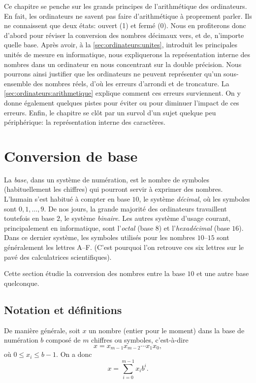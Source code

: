 \documentclass[letterpaper,11pt,english,french]{memoir}
\theoremstyle{plain}
\theoremstyle{definition}
\theoremstyle{remark}
\begin{document}
Ce chapitre se penche sur les grands principes de l'arithmétique des
ordinateurs. En fait, les ordinateurs ne savent pas faire
d'arithmétique à proprement parler. Ils ne connaissent que deux états:
ouvert (1) et fermé (0). Nous en profiterons donc d'abord pour réviser
la conversion des nombres décimaux vers, et de, n'importe quelle base.
Après avoir, à la \autoref{sec:ordinateurs:unites}, introduit les
principales unités de mesure en informatique, nous expliquerons la
représentation interne des nombres dans un ordinateur en nous
concentrant sur la double précision. Nous pourrons ainsi justifier que
les ordinateurs ne peuvent représenter qu'un sous-ensemble des nombres
réels, d'où les erreurs d'arrondi et de troncature. La
\autoref{sec:ordinateurs:arithmetique} explique comment ces erreurs
surviennent. On y donne également quelques pistes pour éviter ou pour
diminuer l'impact de ces erreurs. Enfin, le chapitre se clôt par un
survol d'un sujet quelque peu périphérique: la représentation interne
des caractères.


\section{Conversion de base}
\label{sec:ordinateurs:conversion}

La \emph{base}, dans un système de numération, est le nombre de
symboles (habituellement les chiffres) qui pourront servir à exprimer
des nombres. L'humain s'est habitué à compter en base $10$, le système
\emph{décimal}, où les symboles sont $0, 1, \dots, 9$. De nos jours,
la grande majorité des ordinateurs travaillent toutefois en base $2$, le
système \emph{binaire}. Les autres système d'usage courant,
principalement en informatique, sont l'\emph{octal} (base $8$) et
l'\emph{hexadécimal} (base $16$). Dans ce dernier système, les symboles
utilisés pour les nombres $10$--$15$ sont généralement les lettres A--F.
(C'est pourquoi l'on retrouve ces six lettres sur le pavé des
calculatrices scientifiques).

Cette section étudie la conversion des nombres entre la base $10$ et une
autre base quelconque.

\subsection{Notation et définitions}
\label{sec:ordinateurs:conversion:notation}

De manière générale, soit $x$ un nombre (entier pour le moment) dans
la base de numération $b$ composé de $m$ chiffres ou symboles, c'est-à-dire
\begin{equation*}
  x = x_{m-1}x_{m-2} \cdots x_1x_0,
\end{equation*}
où $0 \leq x_i \leq b - 1$. On a donc
\begin{equation}
  \label{eq:ordinateurs:def_base}
  x = \sum_{i = 0}^{m - 1} x_i b^i.
\end{equation}
\end{document}

